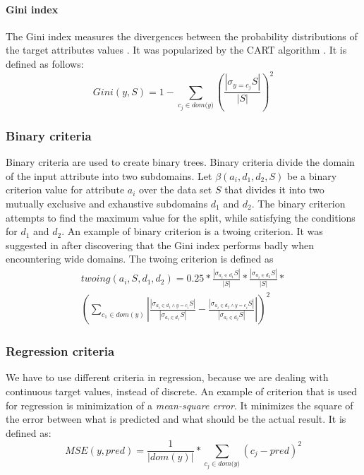 \documentclass[thesis=B,english]{FITthesis}[2012/10/20]
\begin{document}
				\paragraph*{Gini index}
				The Gini index measures the divergences between the probability distributions of the target attributes values \cite{DMWithDecisionTrees}. It was popularized by the CART algorithm \cite{CART}. It is defined as follows:
				\[
					\textit{Gini}\left(y, S\right)=1 - \sum _{c_j \in \textit{dom(y)}}\left(\frac{|\sigma_{y=c_j}S|}{|S|}\right)^2
				\]
				\subsubsection*{Binary criteria}
				Binary criteria are used to create binary trees. Binary criteria divide the domain of the input attribute into two subdomains. Let \(\beta(a_i, d_1, d_2, S)\) be a binary criterion value for attribute \(a_i\) over the data set \(S\) that divides it into two mutually exclusive and exhaustive subdomains \(d_1\) and \(d_2\). The binary criterion attempts to find the maximum value for the split, while satisfying the conditions for \(d_1\) and \(d_2\). An example of binary criterion is a twoing criterion. It was suggested in \cite{CART} after discovering that the Gini index performs badly when encountering wide domains. The twoing criterion is defined as
				\begin{multline*}
					\textit{twoing}(a_i, S, d_1, d_2) = 0.25 * \frac{|\sigma_{a_{i} \in d_1}S|}{|S|}* \frac{|\sigma_{a_{i} \in d_2}S|}{|S|}  * \\ \left(\sum_{c_{1}\in\textit{dom}(y)}{
					\left|
					\frac{\left|
							\sigma_{a_{i}\in d_{1} \wedge y=c_i}S
						\right|}
						{|\sigma_{a_{i} \in d_1}S|} - \frac{\left|
							\sigma_{a_{i}\in d_{2} \wedge y=c_i}S
						\right|}
						{|\sigma_{a_{i} \in d_2}S|}
					\right|
					}\right)^2
				\end{multline*}
				\subsubsection*{Regression criteria}

				We have to use different criteria in regression, because we are dealing with continuous target values, instead of discrete. An example of criterion that is used for regression is minimization of a \textit{mean-square error}. It minimizes the square of the error between what is predicted and what should be the actual result. It is defined as:
				\[
					\textit{MSE}\left(y, \textit{pred}\right)= \frac{1}{|dom(y)|}*\sum _{c_j \in \textit{dom(y)}}\left(c_j - \textit{pred}\right)^2
				\]
\end{document}
